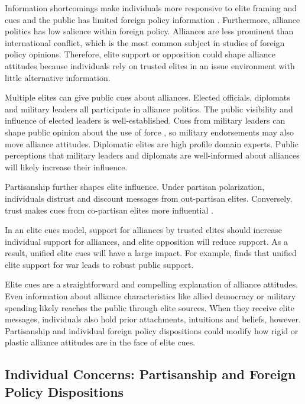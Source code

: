 \documentclass[12pt]{article}
\begin{document}
Information shortcomings make individuals more responsive to elite framing and cues \citep{Druckman2001, Peterson2017} and the public has limited foreign policy information \citep{BaumPotter2008}.
Furthermore, alliance politics has low salience within foreign policy. 
Alliances are less prominent than international conflict, which is the most common subject in studies of foreign policy opinions. 
Therefore, elite support or opposition could shape alliance attitudes because individuals rely on trusted elites in an issue environment with little alternative information. 


Multiple elites can give public cues about alliances.
Elected officials, diplomats and military leaders all participate in alliance politics.
The public visibility and influence of elected leaders is well-established.  
Cues from military leaders can shape public opinion about the use of force \citep{Golbyetal2018}, so military endorsements may also move alliance attitudes. 
Diplomatic elites are high profile domain experts. 
Public perceptions that military leaders and diplomats are well-informed about alliances will likely increase their influence. 


Partisanship further shapes elite influence.
Under partisan polarization, individuals distrust and discount messages from out-partisan elites. 
Conversely, trust makes cues from co-partisan elites more influential \citep{Druckmanetal2013}. 


In an elite cues model, support for alliances by trusted elites should increase individual support for alliances, and elite opposition will reduce support.  
As a result, unified elite cues will have a large impact.
For example, \citet{Berinsky2007} finds that unified elite support for war leads to robust public support. 


Elite cues are a straightforward and compelling explanation of alliance attitudes.
Even information about alliance characteristics like allied democracy or military spending likely reaches the public through elite sources. 
When they receive elite messages, individuals also hold prior attachments, intuitions and beliefs, however.
Partisanship and individual foreign policy dispositions could modify how rigid or plastic alliance attitudes are in the face of elite cues. 


\subsection{Individual Concerns: Partisanship and Foreign Policy Dispositions}
\end{document}
